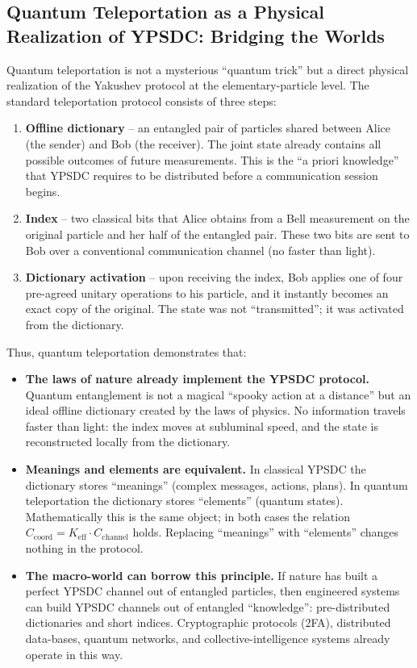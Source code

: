 \documentclass[12pt,a4paper]{article}
\theoremstyle{remark}
\begin{document}
	\subsection{Quantum Teleportation as a Physical Realization of YPSDC: Bridging the Worlds}
	
	Quantum teleportation is not a mysterious ``quantum trick'' but a direct physical realization of the Yakushev protocol at the elementary-particle level. The standard teleportation protocol consists of three steps:
	
	\begin{enumerate}
		\item \textbf{Offline dictionary} -- an entangled pair of particles shared between Alice (the sender) and Bob (the receiver). The joint state already contains all possible outcomes of future measurements. This is the ``a priori knowledge'' that YPSDC requires to be distributed before a communication session begins.
		\item \textbf{Index} -- two classical bits that Alice obtains from a Bell measurement on the original particle and her half of the entangled pair. These two bits are sent to Bob over a conventional communication channel (no faster than light).
		\item \textbf{Dictionary activation} -- upon receiving the index, Bob applies one of four pre-agreed unitary operations to his particle, and it instantly becomes an exact copy of the original. The state was not ``transmitted''; it was activated from the dictionary.
	\end{enumerate}
	
	Thus, quantum teleportation demonstrates that:
	
	\begin{itemize}
		\item \textbf{The laws of nature already implement the YPSDC protocol.} Quantum entanglement is not a magical ``spooky action at a distance'' but an ideal offline dictionary created by the laws of physics. No information travels faster than light: the index moves at subluminal speed, and the state is reconstructed locally from the dictionary.
		\item \textbf{Meanings and elements are equivalent.} In classical YPSDC the dictionary stores ``meanings'' (complex messages, actions, plans). In quantum teleportation the dictionary stores ``elements'' (quantum states). Mathematically this is the same object; in both cases the relation \( C_{\mathrm{coord}} = K_{\mathrm{eff}} \cdot C_{\mathrm{channel}} \) holds. Replacing ``meanings'' with ``elements'' changes nothing in the protocol.
		\item \textbf{The macro-world can borrow this principle.} If nature has built a perfect YPSDC channel out of entangled particles, then engineered systems can build YPSDC channels out of entangled ``knowledge'': pre-distributed dictionaries and short indices. Cryptographic protocols (2FA), distributed data-bases, quantum networks, and collective-intelligence systems already operate in this way.
	\end{itemize}
	
\end{document}
